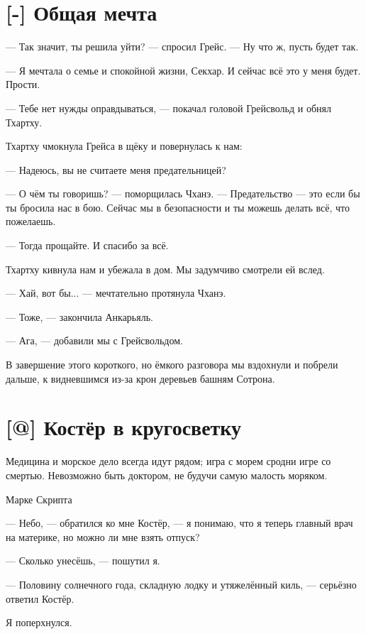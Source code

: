 \section{[-] Общая мечта}

\textspace

--- Так значит, ты решила уйти? --- спросил Грейс. --- Ну что ж, пусть будет
так.

--- Я мечтала о семье и спокойной жизни, Секхар. И сейчас всё это у меня будет.
Прости.

--- Тебе нет нужды оправдываться, --- покачал головой Грейсвольд и обнял Тхартху.

Тхартху чмокнула Грейса в щёку и повернулась к нам:

--- Надеюсь, вы не считаете меня предательницей?

--- О чём ты говоришь? --- поморщилась Чханэ.
--- Предательство --- это если бы ты бросила нас в бою.
Сейчас мы в безопасности и ты можешь делать всё, что пожелаешь.

--- Тогда прощайте.
И спасибо за всё.

Тхартху кивнула нам и убежала в дом.
Мы задумчиво смотрели ей вслед.

--- Хай, вот бы... --- мечтательно протянула Чханэ.

--- Тоже, --- закончила Анкарьяль.

--- Ага, --- добавили мы с Грейсвольдом.

В завершение этого короткого, но ёмкого разговора мы вздохнули и побрели дальше, к видневшимся из-за крон деревьев башням Сотрона.

\section{[@] Костёр в кругосветку}

\epigraph
{Медицина и морское дело всегда идут рядом;
игра с морем сродни игре со смертью\FM.
Невозможно быть доктором, не будучи самую малость моряком.}
{Марке Скрипта}

\textspace

--- Небо, --- обратился ко мне Костёр, --- я понимаю, что я теперь главный врач на материке, но можно ли мне взять отпуск?

--- Сколько унесёшь, --- пошутил я.

--- Половину солнечного года, складную лодку и утяжелённый киль, --- серьёзно ответил Костёр.

Я поперхнулся.

